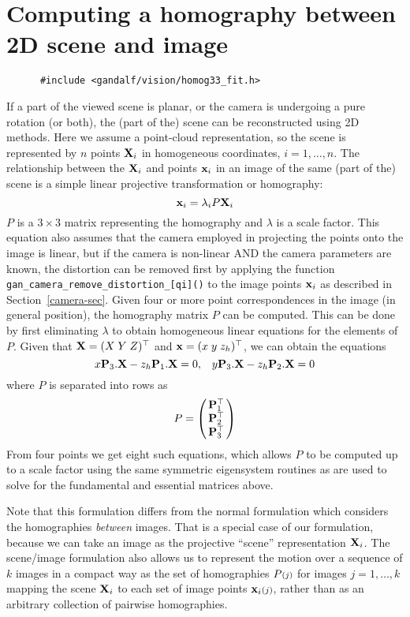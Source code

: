 \section{Computing a homography between 2D scene and image}
\begin{verbatim}
      #include <gandalf/vision/homog33_fit.h>
\end{verbatim}
If a part of the viewed scene is planar, or the camera is undergoing a
pure rotation (or both), the (part of the) scene can be reconstructed
using 2D methods. Here we assume a point-cloud representation, so
the scene is represented by $n$ points $\Xvec_i$ in homogeneous
coordinates, $i=1,\ldots,n$. The relationship between the $\Xvec_i$
and points $\xvec_i$ in an image of the same (part of the) scene is a simple
linear projective transformation or homography:
\begin{equation}
 \xvec_i = \lambda_i P \Xvec_i
 \label{point-proj-eq}
\end{equation}
$P$ is a $3\times 3$ matrix representing the homography and
$\lambda$ is a scale factor. This equation also assumes that the camera
employed in projecting the points onto the image is linear, but if the
camera is non-linear AND the camera parameters are known, the distortion
can be removed first by applying the function
{\tt gan\_camera\_remove\_distortion\_[qi]()} to the image points $\xvec_i$
as described in Section~\ref{camera-sec}.
Given four or more point correspondences
in the image (in general position), the homography matrix $P$ can be computed.
This can be done by first eliminating $\lambda$ to obtain homogeneous
linear equations for the elements of $P$.
Given that $\Xvec=(X\;Y\;Z)\tr$ and $\xvec=(x\;y\;z_h)\tr$,
we can obtain the equations
\begin{equation}
 x \Pvec_3.\Xvec - z_h \Pvec_1.\Xvec = 0,\;\;\;
 y \Pvec_3.\Xvec - z_h \Pvec_2.\Xvec = 0
 \label{homog-point}
\end{equation}
where $P$ is separated into rows as
\[ P = \beginm{c} \Pvec_1\tr \\ \Pvec_2\tr \\ \Pvec_3\tr \endm
\]
From four points we get eight such equations, which allows $P$ to be
computed up to a scale factor using the same symmetric eigensystem routines
as are used to solve for the fundamental and essential matrices above.

Note that this formulation differs from the normal formulation which
considers the homographies {\em between} images. That is a special case
of our formulation, because we can take an image as the projective
``scene'' representation $\Xvec_i$. The scene/image formulation also
allows us to represent the motion over a sequence of $k$ images in 
a compact way as the set of homographies $P\brj$ for images $j=1,\ldots,k$
mapping the scene $\Xvec_i$ to each set of image points $\xvec_i\brj$,
rather than as an arbitrary collection of pairwise homographies.

